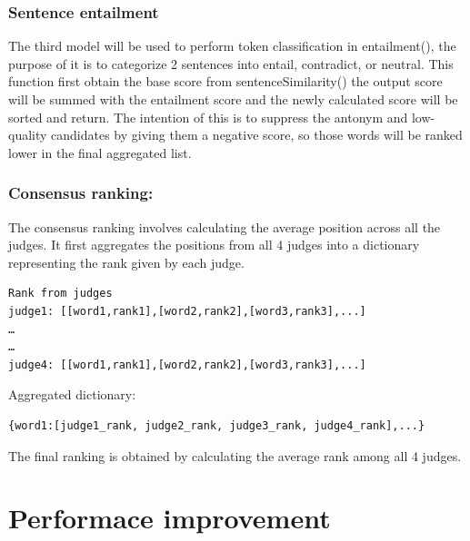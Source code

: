 \documentclass[12pt,oneside,openright,a4paper]{cpe-english-project}
\begin{document}
\subsubsection{Sentence entailment}
The third model will be used to perform token classification in entailment(), the purpose of it is to categorize 2 sentences into entail, contradict, or neutral. 
This function first obtain the base score from sentenceSimilarity() the output score will be summed with the entailment score and the newly calculated score will be sorted and return. The intention of this is to suppress the antonym and low-quality candidates by giving them a negative score, so those words will be ranked lower in the final aggregated list.






\subsubsection{ Consensus ranking:}

The consensus ranking involves calculating the average position across all the judges. It first aggregates the positions from all 4 judges into a dictionary representing the rank given by each judge. 
\begin{verbatim}
Rank from judges
judge1: [[word1,rank1],[word2,rank2],[word3,rank3],...]
…
…
judge4: [[word1,rank1],[word2,rank2],[word3,rank3],...]

\end{verbatim}
Aggregated dictionary: 
\begin{verbatim}
{word1:[judge1_rank, judge2_rank, judge3_rank, judge4_rank],...}
\end{verbatim}
The final ranking is obtained by calculating the average rank among all 4 judges.


\section{Performace improvement}
\end{document}
